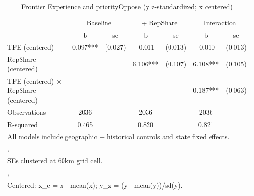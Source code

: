 \begin{table}[htbp]\centering
\def\sym#1{\ifmmode^{#1}\else\(^{#1}\)\fi}
\caption{Frontier Experience and priorityOppose (y z-standardized; x centered)}
\begin{tabular}{l*{3}{cc}}
\toprule
                &\multicolumn{2}{c}{Baseline}&\multicolumn{2}{c}{ + RepShare}&\multicolumn{2}{c}{Interaction}\\
                &        b   &       se&        b   &       se&        b   &       se\\
\midrule
TFE (centered)  &    0.097***&  (0.027)&   -0.011   &  (0.013)&   -0.010   &  (0.013)\\
RepShare (centered)&            &         &    6.106***&  (0.107)&    6.108***&  (0.105)\\
TFE (centered) $\times$ RepShare (centered)&            &         &            &         &    0.187***&  (0.063)\\
\midrule
Observations    &     2036   &         &     2036   &         &     2036   &         \\
R-squared       &    0.465   &         &    0.820   &         &    0.821   &         \\
\bottomrule
\multicolumn{7}{l}{\footnotesize All models include geographic + historical controls and state fixed effects.}\\
\multicolumn{7}{l}{\footnotesize ,}\\
\multicolumn{7}{l}{\footnotesize SEs clustered at 60km grid cell.}\\
\multicolumn{7}{l}{\footnotesize ,}\\
\multicolumn{7}{l}{\footnotesize Centered: x\_c = x - mean(x); y\_z = (y - mean(y))/sd(y).}\\
\end{tabular}
\end{table}
